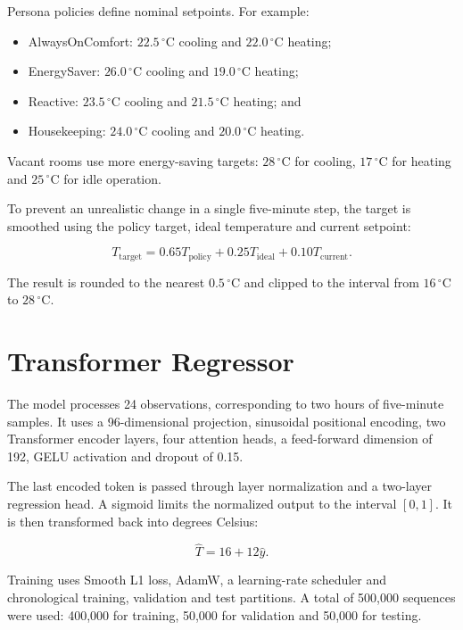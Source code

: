 Persona policies define nominal setpoints. For example:

\begin{itemize}
    \item AlwaysOnComfort: $22.5\,^{\circ}\mathrm{C}$ cooling and
    $22.0\,^{\circ}\mathrm{C}$ heating;
    \item EnergySaver: $26.0\,^{\circ}\mathrm{C}$ cooling and
    $19.0\,^{\circ}\mathrm{C}$ heating;
    \item Reactive: $23.5\,^{\circ}\mathrm{C}$ cooling and
    $21.5\,^{\circ}\mathrm{C}$ heating; and
    \item Housekeeping: $24.0\,^{\circ}\mathrm{C}$ cooling and
    $20.0\,^{\circ}\mathrm{C}$ heating.
\end{itemize}

Vacant rooms use more energy-saving targets: $28\,^{\circ}\mathrm{C}$ for
cooling, $17\,^{\circ}\mathrm{C}$ for heating and
$25\,^{\circ}\mathrm{C}$ for idle operation.

To prevent an unrealistic change in a single five-minute step, the target is
smoothed using the policy target, ideal temperature and current setpoint:

\[
    T_{\mathrm{target}} =
    0.65T_{\mathrm{policy}} +
    0.25T_{\mathrm{ideal}} +
    0.10T_{\mathrm{current}}.
\]

The result is rounded to the nearest $0.5\,^{\circ}\mathrm{C}$ and clipped to
the interval from $16\,^{\circ}\mathrm{C}$ to $28\,^{\circ}\mathrm{C}$.

\section{Transformer Regressor}

The model processes 24 observations, corresponding to two hours of five-minute
samples. It uses a 96-dimensional projection, sinusoidal positional encoding,
two Transformer encoder layers, four attention heads, a feed-forward dimension
of 192, GELU activation and dropout of 0.15.

The last encoded token is passed through layer normalization and a two-layer
regression head. A sigmoid limits the normalized output to the interval
$[0,1]$. It is then transformed back into degrees Celsius:

\[
    \hat{T} = 16 + 12\hat{y}.
\]

Training uses Smooth L1 loss, AdamW, a learning-rate scheduler and chronological
training, validation and test partitions. A total of 500,000 sequences were
used: 400,000 for training, 50,000 for validation and 50,000 for testing.

